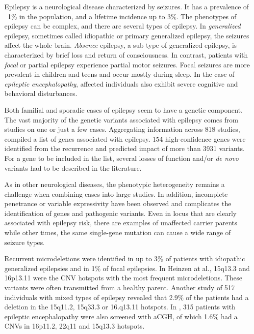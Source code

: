 Epilepsy is a neurological disease characterized by seizures. 
It has a prevalence of ~1\% in the population, and a lifetime incidence up to 3\%.
The phenotypes of epilepsy can be complex, and there are several types of epilepsy.
In {\it generalized} epilepsy, sometimes called idiopathic or primary generalized epilepsy, the seizures affect the whole brain.
{\it Absence} epilepsy, a sub-type of generalized epilepsy, is characterized by brief loss and return of consciousness.
In contrast, patients with {\it focal} or partial epilepsy experience partial motor seizures.
Focal seizures are more prevalent in children and teens and occur mostly during sleep.
In the case of {\it epileptic encephalopathy}, affected individuals also exhibit severe cognitive and behavioral disturbances.

Both familial and sporadic cases of epilepsy seem to have a genetic component.
The vast majority of the genetic variants associated with epilepsy comes from studies on one or just a few cases.
Aggregating information across 818 studies, \citet{Ran2015} compiled a list of genes associated with epilepsy.
154 high-confidence genes were identified from the recurrence and predicted impact of more than 3931 variants.
For a gene to be included in the list, several losses of function and/or {\it de novo} variants had to be described in the literature.

As in other neurological diseases, the phenotypic heterogeneity remains a challenge when combining cases into large studies.
In addition, incomplete penetrance or variable expressivity have been observed and complicates the identification of genes and pathogenic variants.
Even in locus that are clearly associated with epilepsy risk, there are examples of unaffected carrier parents while other times, the same single-gene mutation can cause a wide range of seizure types\cite{Mefford2010}.

Recurrent microdeletions were identified in up to 3\% of patients with idiopathic generalized epilepsies and in 1\% of focal epilepsies\cite{Helbig2014}.
In Heinzen at al., 15q13.3 and 16p13.11 were the CNV hotspots with the most frequent microdeletions\cite{Heinzen2010}.
These variants were often transmitted from a healthy parent.
Another study of 517 individuals with mixed types of epilepsy revealed that 2.9\% of the patients had a deletion in the 15q11.2, 15q33.3 or 16.q13.11 hotspots\cite{Mefford2010}.
In \citet{Mefford2011}, 315 patients with epileptic encephalopathy were also screened with aCGH, of which 1.6\% had a CNVs in 16p11.2, 22q11 and 15q13.3 hotspots.

